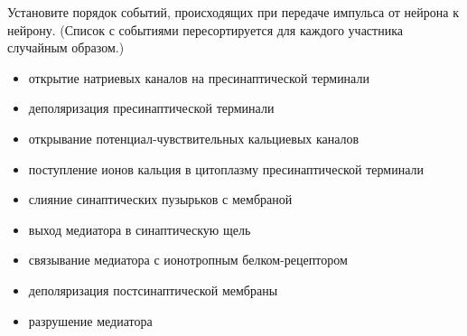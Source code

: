 
Установите порядок событий, происходящих при передаче импульса от нейрона к нейрону. (Список с событиями пересортируется для каждого участника случайным образом.)

\begin{itemize}
\item открытие натриевых каналов на пресинаптической терминали
\item деполяризация пресинаптической терминали
\item открывание потенциал-чувствительных кальциевых каналов
\item поступление ионов кальция в цитоплазму пресинаптической терминали
\item слияние синаптических пузырьков с мембраной
\item выход медиатора в синаптическую щель
\item связывание медиатора с ионотропным белком-рецептором
\item деполяризация постсинаптической мембраны
\item разрушение медиатора
\end{itemize}
